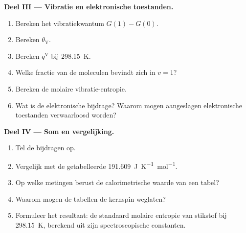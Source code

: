 \begin{problem}
\medskip\noindent\textbf{Deel III --- Vibratie en elektronische toestanden.}
\begin{enumerate}[resume]
  \item Bereken het vibratiekwantum $G(1) - G(0)$.
  \item Bereken $\theta_{\mathrm V}$.
  \item Bereken $q^{\mathrm V}$ bij \qty{298.15}{K}.
  \item Welke fractie van de moleculen bevindt zich in $v = 1$?
  \item Bereken de molaire vibratie-entropie.
  \item Wat is de elektronische bijdrage? Waarom mogen aangeslagen
        elektronische toestanden verwaarloosd worden?
\end{enumerate}

\medskip\noindent\textbf{Deel IV --- Som en vergelijking.}
\begin{enumerate}[resume]
  \item Tel de bijdragen op.
  \item Vergelijk met de getabelleerde \qty{191.609}{J.K^{-1}.mol^{-1}}.
  \item Op welke metingen berust de calorimetrische waarde van een tabel?
  \item Waarom mogen de tabellen de kernspin weglaten?
  \item Formuleer het resultaat: de standaard molaire entropie van stikstof
        bij \qty{298.15}{K}, berekend uit zijn spectroscopische constanten.
\end{enumerate}
\end{problem}
